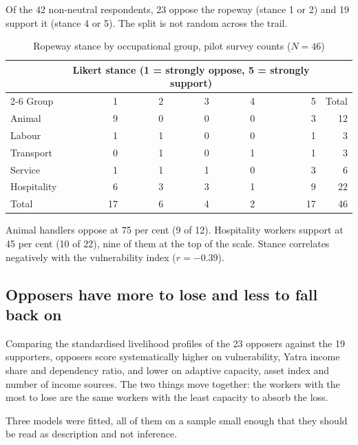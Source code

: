 \documentclass[11pt]{article}
\begin{document}
Of the 42 non-neutral respondents, 23 oppose the ropeway (stance 1 or 2) and 19 support it
(stance 4 or 5). The split is not random across the trail.

\begin{table}[h]
\centering
\caption{Ropeway stance by occupational group, pilot survey counts ($N=46$)}
\begin{tabular}{lrrrrrr}
\toprule
 & \multicolumn{5}{c}{Likert stance (1 = strongly oppose, 5 = strongly support)} & \\
\cmidrule(lr){2-6}
Group & 1 & 2 & 3 & 4 & 5 & Total \\
\midrule
Animal      &  9 & 0 & 0 & 0 &  3 & 12 \\
Labour      &  1 & 1 & 0 & 0 &  1 &  3 \\
Transport   &  0 & 1 & 0 & 1 &  1 &  3 \\
Service     &  1 & 1 & 1 & 0 &  3 &  6 \\
Hospitality &  6 & 3 & 3 & 1 &  9 & 22 \\
\midrule
Total & 17 & 6 & 4 & 2 & 17 & 46 \\
\bottomrule
\end{tabular}
\end{table}

Animal handlers oppose at 75 per cent (9 of 12). Hospitality workers support at 45 per cent
(10 of 22), nine of them at the top of the scale. Stance correlates negatively with the
vulnerability index ($r = -0.39$).

\subsection{Opposers have more to lose and less to fall back on}

Comparing the standardised livelihood profiles of the 23 opposers against the 19 supporters,
opposers score systematically higher on vulnerability, Yatra income share and dependency
ratio, and lower on adaptive capacity, asset index and number of income sources. The two
things move together: the workers with the most to lose are the same workers with the least
capacity to absorb the loss.

Three models were fitted, all of them on a sample small enough that they should be read as
description and not inference.
\end{document}

